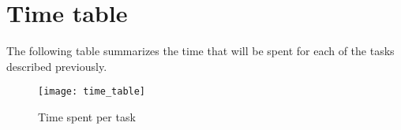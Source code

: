 \section{Time table}

The following table summarizes the time that will be spent for each of the tasks described 
previously.

\begin{figure}[h]
    \centering
    \texttt{[image: time\_table]}
    \caption{Time spent per task}
    \label{fig:time_table}
\end{figure}

